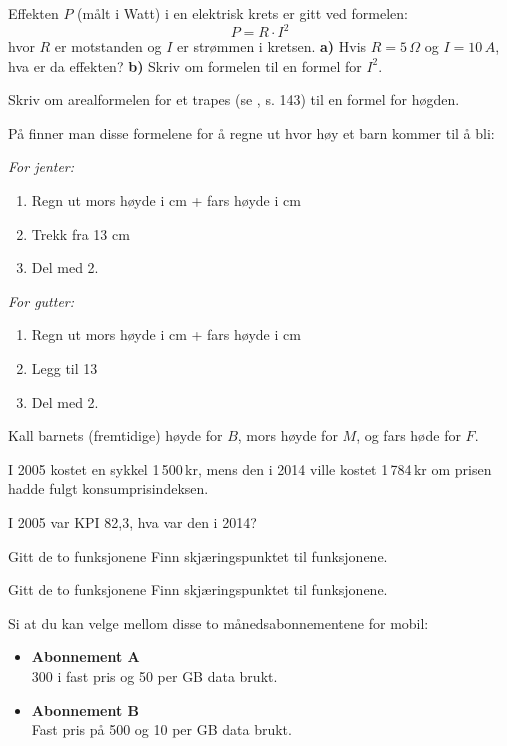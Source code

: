 Effekten $ P $ (målt i Watt) i en elektrisk krets er gitt ved formelen:
\[ P=R\cdot I^2 \]
hvor $ R $ er motstanden og $ I $ er strømmen i kretsen.\os
\textbf{a)} Hvis $ {R=5\,\Omega} $ og $ {I=10\,A} $, hva er da effekten?\os
\textbf{b)} Skriv om formelen til en formel for $ I^2 $.

Skriv om arealformelen for et trapes (se \mb, s. 143) til en formel for høgden.

På
 finner man disse formelene for å regne ut hvor høy et barn kommer til å bli:\os

\textit{For jenter:}
\begin{enumerate}
	\item Regn ut mors høyde i cm + fars høyde i cm
	\item Trekk fra 13 cm
	\item Del med 2.
\end{enumerate}

\textit{For gutter:}
\begin{enumerate}
	\item Regn ut mors høyde i cm + fars høyde i cm
	\item Legg til 13 
	\item Del med 2.
\end{enumerate}
Kall barnets (fremtidige) høyde for $ B $, mors høyde for $ M $, og fars høde for $ F $.

I 2005 kostet en sykkel 1\,500\,kr, mens den i 2014 ville kostet 1\,784\,kr om prisen hadde fulgt konsumprisindeksen. \os

I 2005 var KPI 82,3, hva var den i 2014?


Gitt de to funksjonene
Finn skjæringspunktet til funksjonene.

Gitt de to funksjonene
Finn skjæringspunktet til funksjonene.

Si at du kan velge mellom disse to månedsabonnementene for mobil:
\begin{itemize}
	\item \textbf{Abonnement A} \\
	300 i fast pris og 50 per GB data brukt.
	\item \textbf{Abonnement B} \\
	Fast pris på 500 og 10 per GB data brukt.
\end{itemize}


